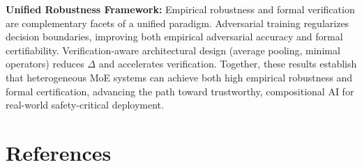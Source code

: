\documentclass[11pt,a4paper]{article}
\begin{document}
\textbf{Unified Robustness Framework:} Empirical robustness and formal verification are complementary facets of a unified paradigm. Adversarial training regularizes decision boundaries, improving both empirical adversarial accuracy and formal certifiability. Verification-aware architectural design (average pooling, minimal operators) reduces $\Delta$ and accelerates verification. Together, these results establish that heterogeneous MoE systems can achieve both high empirical robustness and formal certification, advancing the path toward trustworthy, compositional AI for real-world safety-critical deployment.

\section{References}
\end{document}
